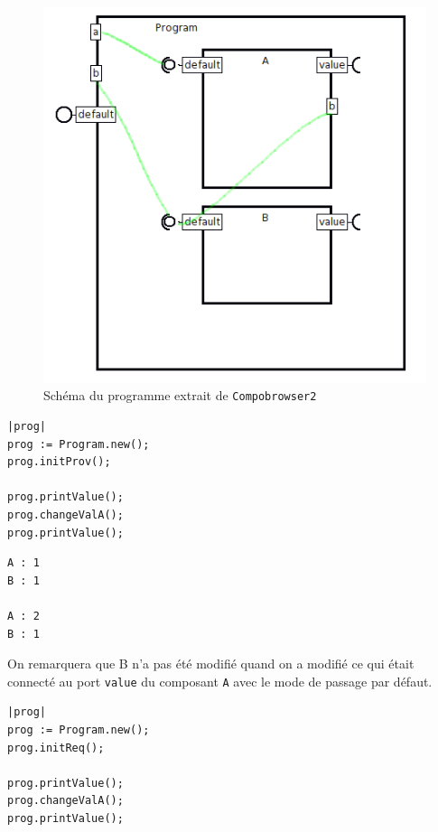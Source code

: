 \documentclass[11pt,a4paper,openany,oneside]{book}
\begin{document}
\begin{appendices}
\begin{figure}[H]
\centering
\includegraphics[scale=0.7, keepaspectratio=true]{passagereqprov}
\caption{Schéma du programme extrait de \texttt{Compobrowser2}}
\label{passagereqprov}
\end{figure}



\newpage

\begin{lstlisting}[language=Compo, frame=single, caption=Workspace (Passage par Fournis)]
|prog|
prog := Program.new();
prog.initProv();

prog.printValue();
prog.changeValA();
prog.printValue();
\end{lstlisting}


\begin{lstlisting}[language=Compo, frame=single, caption=Output]
A : 1
B : 1

A : 2
B : 1
\end{lstlisting}

On remarquera que B n'a pas été modifié quand on a modifié ce qui était connecté au port \texttt{value} du composant \texttt{A} avec le mode de passage par défaut.

\begin{lstlisting}[language=Compo, frame=single, caption=Workspace (Passage par Requis)]
|prog|
prog := Program.new();
prog.initReq();

prog.printValue();
prog.changeValA();
prog.printValue();
\end{lstlisting}



\end{appendices}
\end{document}
